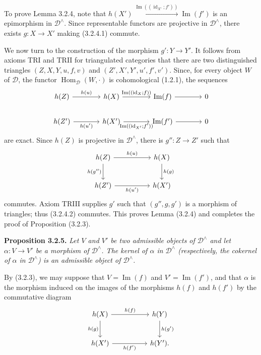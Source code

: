 \clearpage
{}%
\begingroup\small\setlength{\parskip}{0pt}\setlength{\emergencystretch}{3em}
To prove Lemma 3.2.4, note that
$h(X')\xrightarrow{\operatorname{Im}((\operatorname{id}_{X'};f'))}
\operatorname{Im}(f')$ is an epimorphism in $\mathcal D^\wedge$. Since representable functors are
projective in $\mathcal D^\wedge$, there exists $g\colon X\to X'$ making
(3.2.4.1) commute.

We now turn to the construction of the morphism $g'\colon Y\to Y'$. It
follows from axioms TRI and TRII for triangulated
categories that there are two distinguished triangles
$(Z,X,Y,u,f,v)$ and $(Z',X',Y',u',f',v')$. Since, for every object $W$ of
$\mathcal D$, the functor
$\operatorname{Hom}_{\mathcal D}(W,\mathord\cdot)$ is cohomological (1.2.1), the
sequences
\[
\begin{tikzcd}[column sep=3.7em]
h(Z)\arrow[r,"h(u)"]&h(X)\arrow[r,"\operatorname{Im}((\operatorname{id}_X;f))"]&\operatorname{Im}(f)\arrow[r]&0\\
h(Z')\arrow[r,"h(u')"']&h(X')\arrow[r,"\operatorname{Im}((\operatorname{id}_{X'};f'))"']&\operatorname{Im}(f')\arrow[r]&0
\end{tikzcd}
\]
are exact. Since $h(Z)$ is projective in $\mathcal D^\wedge$, there is
$g''\colon Z\to Z'$ such that
\[
\begin{tikzcd}[column sep=5em,row sep=2.3em]
h(Z)\arrow[r,"h(u)"]\arrow[d,"h(g'')"']&h(X)\arrow[d,"h(g)"]\\
h(Z')\arrow[r,"h(u')"']&h(X')
\end{tikzcd}
\]
commutes. Axiom TRIII supplies $g'$ such that $(g'',g,g')$ is a morphism of
triangles; thus (3.2.4.2) commutes. This proves Lemma (3.2.4) and completes the
proof of Proposition (3.2.3).

\medskip\noindent\textbf{Proposition 3.2.5.}\quad
\textit{Let $V$ and $V'$ be two admissible objects of $\mathcal D^\wedge$ and
let $\alpha\colon V\to V'$ be a morphism of $\mathcal D^\wedge$. The kernel
of $\alpha$ in $\mathcal D^\wedge$ (respectively, the cokernel of $\alpha$ in
$\mathcal D^\wedge$) is an admissible object of $\mathcal D^\wedge$.}

By (3.2.3), we may suppose that $V=\operatorname{Im}(f)$ and
$V'=\operatorname{Im}(f')$, and that $\alpha$ is the morphism induced on the
images of the morphisms $h(f)$ and $h(f')$ by the commutative diagram
\[
\begin{tikzcd}[column sep=5em,row sep=2.4em]
h(X)\arrow[r,"h(f)"]\arrow[d,"h(g)"']&h(Y)\arrow[d,"h(g')"]\\
h(X')\arrow[r,"h(f')"']&h(Y').
\end{tikzcd}
\]
\endgroup
